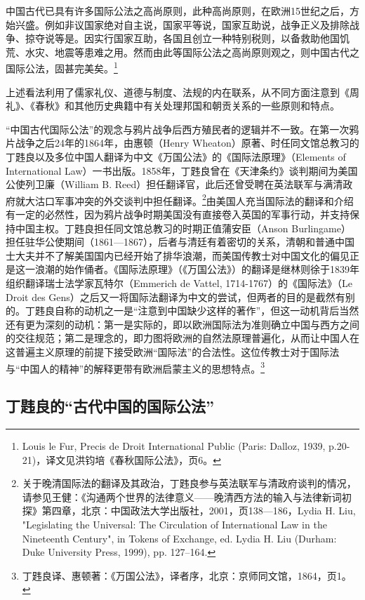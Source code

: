 \documentclass[a4paper, 12pt, openright]{ctexbook}
\renewenvironment{quote}
  {\list{}{\rightmargin2\ccwd \leftmargin2\ccwd \itemindent=2\ccwd \listparindent=2\ccwd}%
   \item\relax\small\kaishu\color{black}}
  {\endlist}
\begin{document}
\begin{quote}
中国古代已具有许多国际公法之高尚原则，此种高尚原则，在欧洲15世纪之后，方始兴盛。例如非议国家绝对自主说，国家平等说，国家互助说，战争正义及排除战争、掠夺说等是。因实行国家互助，各国且创立一种特别税则，以备救助他国饥荒、水灾、地震等患难之用。然而由此等国际公法之高尚原则观之，则中国古代之国际公法，固甚完美矣。\footnote{Louis le Fur, Precis de Droit International Public (Paris: Dalloz, 1939, p.20-21)，译文见洪钧培《春秋国际公法》，页6。}
\end{quote}

上述看法利用了儒家礼仪、道德与制度、法规的内在联系，从不同方面注意到《周礼》、《春秋》和其他历史典籍中有关处理邦国和朝贡关系的一些原则和特点。

“中国古代国际公法”的观念与鸦片战争后西方殖民者的逻辑并不一致。在第一次鸦片战争之后24年的1864年，由惠顿（Henry Wheaton）原著、时任同文馆总教习的丁韪良以及多位中国人翻译为中文《万国公法》的《国际法原理》（Elements of International Law）一书出版。1858年，丁韪良曾在《天津条约》谈判期间为美国公使列卫廉（William B. Reed）担任翻译官，此后还曾受聘在英法联军与满清政府就大沽口军事冲突的外交谈判中担任翻译。\footnote{关于晚清国际法的翻译及其政治，丁韪良参与英法联军与清政府谈判的情况，请参见王健：《沟通两个世界的法律意义——晚清西方法的输入与法律新词初探》第四章，北京：中国政法大学出版社，2001，页138—186，Lydia H. Liu, "Legislating the Universal: The Circulation of International Law in the Nineteenth Century", in Tokens of Exchange, ed. Lydia H. Liu (Durham: Duke University Press, 1999), pp. 127--164.}由美国人充当国际法的翻译和介绍有一定的必然性，因为鸦片战争时期美国没有直接卷入英国的军事行动，并支持保持中国主权。丁韪良担任同文馆总教习的时期正值蒲安臣（Anson Burlingame）担任驻华公使期间（1861—1867），后者与清廷有着密切的关系，清朝和普通中国士大夫并不了解美国国内已经开始了排华浪潮，而美国传教士对中国文化的偏见正是这一浪潮的始作俑者。《国际法原理》（《万国公法》）的翻译是继林则徐于1839年组织翻译瑞士法学家瓦特尔（Emmerich de Vattel, 1714-1767）的《国际法》（Le Droit des Gens）之后又一将国际法翻译为中文的尝试，但两者的目的是截然有别的。丁韪良自称的动机之一是“注意到中国缺少这样的著作”，但这一动机背后当然还有更为深刻的动机：第一是实际的，即以欧洲国际法为准则确立中国与西方之间的交往规范；第二是理念的，即力图将欧洲的自然法原理普遍化，从而让中国人在这普遍主义原理的前提下接受欧洲“国际法”的合法性。这位传教士对于国际法与“中国人的精神”的解释更带有欧洲启蒙主义的思想特点。\footnote{丁韪良译、惠顿著：《万国公法》，译者序，北京：京师同文馆，1864，页1。}

\subsection{丁韪良的“古代中国的国际公法”}
\end{document}
